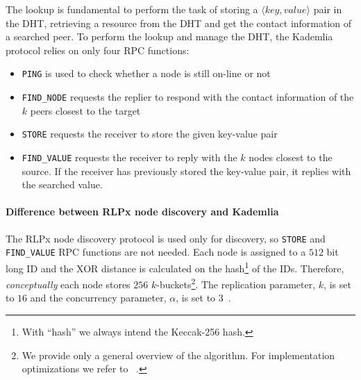 The lookup is fundamental to perform the task of storing a $\langle key,
value\rangle$ pair in the DHT, retrieving a resource from the DHT and get the
contact information of a searched peer. To perform the lookup and manage the
DHT, the Kademlia protocol relies on only four RPC functions:
\begin{itemize}
    \item \verb|PING| is used to check whether a node is still on-line or not
    \item \verb|FIND_NODE| requests the replier to respond with the contact
    information of the $k$ peers closest to the target
    \item \verb|STORE| requests the receiver to store the given key-value pair
    \item \verb|FIND_VALUE| requests the receiver to reply with the $k$ nodes
    closest to the source. If the receiver has previously stored the key-value
    pair, it replies with the searched value.
\end{itemize}


\paragraph{Difference between RLPx node discovery and Kademlia}
\label{sec:rlpx-discovery}
The RLPx node discovery protocol is used only for discovery, so \verb|STORE| and
\verb|FIND_VALUE| RPC functions are not needed. Each node is assigned to a $512$
bit long ID and the XOR distance is calculated on the hash\footnote{With
``hash'' we always intend the Keccak-256 hash.} of the IDs. Therefore,
\emph{conceptually} each node stores $256$ $k$-buckets\footnote{We provide only
a general overview of the algorithm. For implementation optimizations we refer
to ~\cite{bib:kademlia}.}. The replication parameter, $k$, is set to $16$ and
the concurrency parameter, $\alpha$, is set to
$3$~\cite{bib:rlpx-discovery-protocol}.

